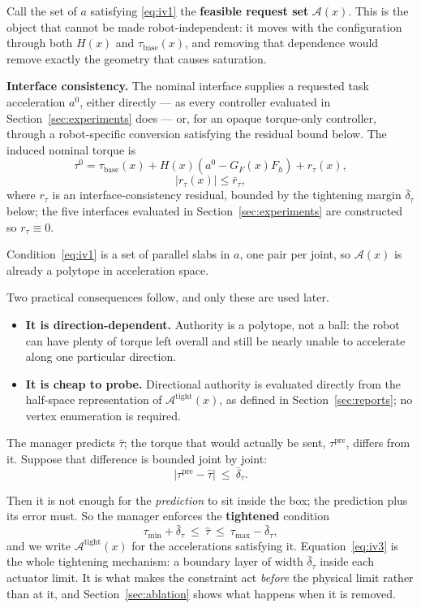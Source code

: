 \documentclass[journal]{IEEEtran}
\begin{document}
Call the set of $a$ satisfying \eqref{eq:iv1} the \textbf{feasible request set} $\mathcal A(x)$. This is the object that cannot be made robot-independent: it moves with the configuration through both $H(x)$ and $\tau_{\mathrm{base}}(x)$, and removing that dependence would remove exactly the geometry that causes saturation.

\textbf{Interface consistency.} The nominal interface supplies a requested task acceleration $a^0$, either directly --- as every controller evaluated in Section~\ref{sec:experiments} does --- or, for an opaque torque-only controller, through a robot-specific conversion satisfying the residual bound below. The induced nominal torque is
\[
\tau^0=\tau_{\mathrm{base}}(x)+H(x)\!\left(a^0-G_F(x)F_h\right)+r_\tau(x),
\]
\[
|r_\tau(x)|\le\bar r_\tau,
\]
where $r_\tau$ is an interface-consistency residual, bounded by the tightening margin $\bar\delta_\tau$ below; the five interfaces evaluated in Section~\ref{sec:experiments} are constructed so $r_\tau\equiv0$.

Condition~\eqref{eq:iv1} is a set of parallel slabs in $a$, one pair per joint, so $\mathcal A(x)$ is already a polytope in acceleration space.

Two practical consequences follow, and only these are used later.
\begin{itemize}
\item \textbf{It is direction-dependent.} Authority is a polytope, not a ball: the robot can have plenty of torque left overall and still be nearly unable to accelerate along one particular direction.
\item \textbf{It is cheap to probe.} Directional authority is evaluated directly from the half-space representation of $\mathcal A^{\mathrm{tight}}(x)$, as defined in Section~\ref{sec:reports}; no vertex enumeration is required.
\end{itemize}

The manager predicts $\hat\tau$; the torque that would actually be sent, $\tau^{\mathrm{pre}}$, differs from it. Suppose that difference is bounded joint by joint:
\begin{equation}
\left|\tau^{\mathrm{pre}}-\hat\tau\right|\ \le\ \bar\delta_\tau.
\label{eq:iv2}
\end{equation}

Then it is not enough for the \emph{prediction} to sit inside the box; the prediction plus its error must. So the manager enforces the \textbf{tightened} condition
\begin{equation}
\tau_{\min}+\bar\delta_\tau\ \le\ \hat\tau\ \le\ \tau_{\max}-\bar\delta_\tau,
\label{eq:iv3}
\end{equation}
and we write $\mathcal A^{\mathrm{tight}}(x)$ for the accelerations satisfying it. Equation~\eqref{eq:iv3} is the whole tightening mechanism: a boundary layer of width $\bar\delta_\tau$ inside each actuator limit. It is what makes the constraint act \emph{before} the physical limit rather than at it, and Section~\ref{sec:ablation} shows what happens when it is removed.
\end{document}
